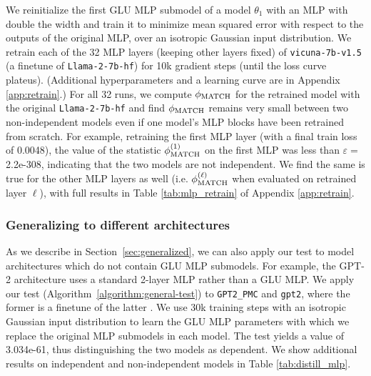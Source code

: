 We reinitialize the first GLU MLP submodel of a model $\theta_1$ with an MLP with double the width and train it to minimize mean squared error with respect to the outputs of the original MLP, over an isotropic Gaussian input distribution.
We retrain each of the 32 MLP layers (keeping other layers fixed) of \texttt{vicuna-7b-v1.5} (a finetune of \texttt{Llama-2-7b-hf}) for 10k gradient steps (until the loss curve plateus). (Additional hyperparameters and a learning curve are in Appendix \ref{app:retrain}.) For all 32 runs, we compute $\phi_{\textup{MATCH}}$ for the retrained model with the original \texttt{Llama-2-7b-hf} and find $\phi_{\textup{MATCH}}$ remains very small between two non-independent models even if one model's MLP blocks have been retrained from scratch.
For example, retraining the first MLP layer (with a final train loss of 0.0048), the value of the statistic $\phi_{\textup{MATCH}}^{(1)}$ on the first MLP was less than $\varepsilon = $ 2.2e-308, indicating that the two models are not independent. We find the same is true for the other MLP layers as well (i.e. $\phi_{\textup{MATCH}}^{(\ell)}$ when evaluated on retrained layer $\ell$), with full results in Table \ref{tab:mlp_retrain} of Appendix \ref{app:retrain}.

\subsubsection{Generalizing to different architectures}
\label{app:distill-glu}
As we describe in Section~\ref{sec:generalized}, we can also apply our test to model architectures which do not contain GLU MLP submodels.
For example, the GPT-2 architecture uses a standard 2-layer MLP rather than a GLU MLP.
We apply our test (Algorithm~\ref{algorithm:general-test}) to \texttt{GPT2\_PMC} and \texttt{gpt2},
where the former is a finetune of the latter \citep{radford2019language}.
We use 30k training steps with an isotropic Gaussian input distribution to learn the GLU MLP parameters with which we replace the original MLP submodels in each model.
The test yields a value of 3.034e-61, thus distinguishing the two models as dependent. We show additional results on independent and non-independent models in Table \ref{tab:distill_mlp}.

